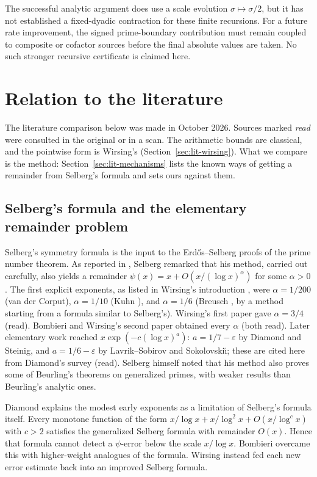 \documentclass[11pt,letterpaper]{article}
\numberwithin{equation}{section}
\theoremstyle{definition}
\theoremstyle{remark}
\begin{document}
The successful analytic argument does use a scale evolution
$\sigma\mapsto\sigma/2$, but it has not established a fixed-dyadic
contraction for these finite recursions. For a future rate improvement,
the signed prime-boundary contribution must remain coupled to composite
or cofactor sources before the final absolute values are taken.
No such stronger recursive certificate is claimed here.

\section{Relation to the literature}\label{sec:literature}

The literature comparison below was made in October 2026. Sources
marked \emph{read} were consulted in the original or in a scan. The
arithmetic bounds are classical, and the pointwise form is Wirsing's
(Section~\ref{sec:lit-wirsing}). What we compare is the method:
Section~\ref{sec:lit-mechanisms} lists the known ways of getting a
remainder from Selberg's formula and sets ours against them.

\subsection{Selberg's formula and the elementary remainder problem}

Selberg's symmetry formula \cite{selberg} is the input to the
Erd\H{o}s--Selberg proofs of the prime number theorem. As reported in \cite{wirsing1}, Selberg remarked that
his method, carried out carefully, also yields a remainder
$\psi(x)=x+O(x/(\log x)^{\alpha})$ for some $\alpha>0$. The first explicit
exponents, as listed in Wirsing's introduction \cite{wirsing1}, were
$\alpha=1/200$ (van der Corput), $\alpha=1/10$ (Kuhn \cite{kuhn}), and
$\alpha=1/6$ (Breusch \cite{breusch}, by a method starting from a formula
similar to Selberg's). Wirsing's first paper \cite{wirsing1} gave
$\alpha=3/4$ (read). Bombieri \cite{bombieri} and Wirsing's second paper
\cite{wirsing2} obtained every $\alpha$ (both read).
Later elementary work reached
$x\exp(-c(\log x)^{a})$: $a=1/7-\varepsilon$ by Diamond and Steinig, and
$a=1/6-\varepsilon$ by Lavrik--Sobirov and Sokolovski\u\i; these are cited
here from Diamond's survey \cite{diamond-survey} (read).
Selberg himself noted \cite[footnote~2]{selberg} that his method also
proves some of Beurling's theorems on generalized primes, with weaker
results than Beurling's analytic ones.

Diamond \cite[Section~8]{diamond-survey} explains the modest early exponents as
a limitation of Selberg's formula itself. Every monotone function of the
form $x/\log x+x/\log^2x+O(x/\log^cx)$ with $c>2$ satisfies the
generalized Selberg formula with remainder $O(x)$. Hence that formula
cannot detect a $\psi$-error below the scale $x/\log x$. Bombieri
overcame this with higher-weight analogues of the formula. Wirsing
instead fed each new error estimate back into an improved Selberg
formula.
\end{document}
